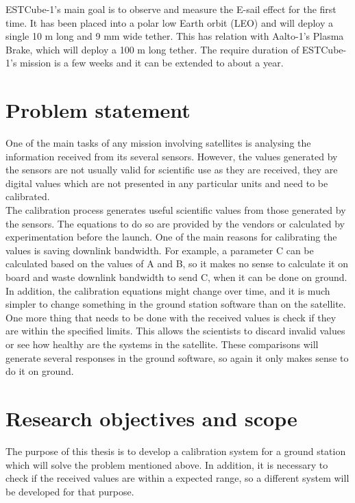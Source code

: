 ESTCube-1's main goal is to observe and measure the E-sail effect for the first time. It has been placed into a polar low Earth orbit (LEO) and will deploy a single 10 m long and 9 mm wide tether\cite{ESTCube}. This has relation with Aalto-1's Plasma Brake, which will deploy a 100 m long tether. The require duration of ESTCube-1's mission is a few weeks and it can be extended to about a year.

\pagebreak

\section{Problem statement}\label{1.2}

One of the main tasks of any mission involving satellites is analysing the information received from its several sensors. However, the values generated by the sensors are not usually valid for scientific use as they are received, they are digital values which are not presented in any particular units and need to be calibrated.\\

The calibration process generates useful scientific values from those generated by the sensors. The equations to do so are provided by the vendors or calculated by experimentation before the launch. One of the main reasons for calibrating the values is saving downlink bandwidth. For example, a parameter C can be calculated based on the values of A and B, so it makes no sense to calculate it on board and waste downlink bandwidth to send C, when it can be done on ground.  In addition, the calibration equations might change over time, and it is much simpler to change something in the ground station software than on the satellite.\\


One more thing that needs to be done with the received values is check if they are within the specified limits. This allows the scientists to discard invalid values or see how healthy are the systems in the satellite. These comparisons will generate several responses in the ground software, so again it only makes sense to do it on ground. 


\section{Research objectives and scope}

The purpose of this thesis is to develop a calibration system for a ground station which will solve the problem mentioned above. In addition, it is necessary to check if the received values are within a expected range, so a different system will be developed for that purpose.\\

